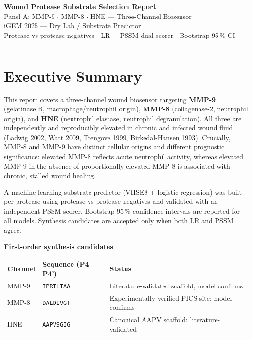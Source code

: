 \documentclass[10pt,a4paper]{article}
\newcommand{\seq}[1]{\texttt{#1}}
\begin{document}
\begin{center}
  {\LARGE\bfseries Wound Protease Substrate Selection Report}\\[4pt]
  {\large Panel A: MMP-9 $\cdot$ MMP-8 $\cdot$ HNE --- Three-Channel Biosensor}\\[2pt]
  {\small\color{gray} iGEM 2025 --- Dry Lab / Substrate Predictor}\\[1pt]
  {\small\color{gray} Protease-vs-protease negatives $\cdot$ LR + PSSM dual scorer $\cdot$ Bootstrap 95\,\% CI}
\end{center}

\vspace{0.5em}\hrule\vspace{0.8em}

\section{Executive Summary}

This report covers a three-channel wound biosensor targeting
\textbf{MMP-9} (gelatinase B, macrophage/neutrophil origin),
\textbf{MMP-8} (collagenase-2, neutrophil origin), and
\textbf{HNE} (neutrophil elastase, neutrophil degranulation).
All three are independently and reproducibly elevated in chronic and
infected wound fluid (Ladwig 2002, Watt 2009, Trengove 1999, Birkedal-Hansen 1993).
Crucially, MMP-8 and MMP-9 have distinct cellular origins and different
prognostic significance: elevated MMP-8 reflects acute neutrophil activity,
whereas elevated MMP-9 in the absence of proportionally elevated MMP-8
is associated with chronic, stalled wound healing.

A machine-learning substrate predictor (VHSE8 + logistic regression) was
built per protease using protease-vs-protease negatives and validated with
an independent PSSM scorer.  Bootstrap 95\,\% confidence intervals are
reported for all models.  Synthesis candidates are accepted only when both
LR and PSSM agree.

\medskip
\begin{tcolorbox}[colback=boxblue,colframe=blue!40,boxrule=0.5pt]
\textbf{First-order synthesis candidates}\\[2pt]
\begin{tabular}{lll}
  \textbf{Channel} & \textbf{Sequence (P4--P4')} & \textbf{Status}\\
  MMP-9 & \seq{IPRTLTAA} & Literature-validated scaffold; model confirms\\
  MMP-8 & \seq{DAEDIVGT} & Experimentally verified PICS site; model confirms\\
  HNE   & \seq{AAPVSGIG} & Canonical AAPV scaffold; literature-validated\\
\end{tabular}
\end{tcolorbox}
\end{document}
